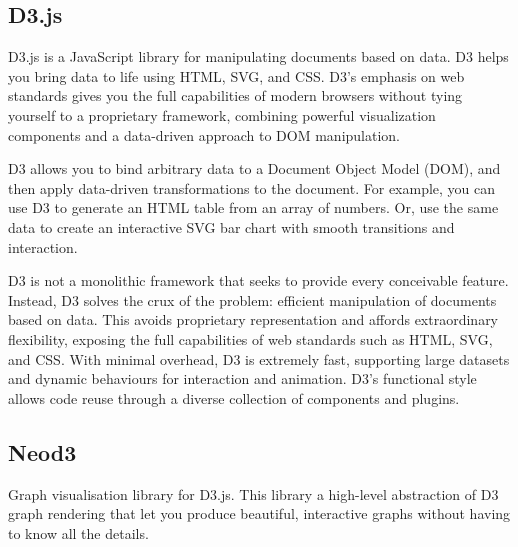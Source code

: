 \subsection{D3.js}
\par D3.js is a JavaScript library for manipulating documents based on data. D3 helps you bring data to life using HTML, SVG, and CSS. D3’s emphasis on web standards gives you the full capabilities of modern browsers without tying yourself to a proprietary framework, combining powerful visualization components and a data-driven approach to DOM manipulation.
\par D3 allows you to bind arbitrary data to a Document Object Model (DOM), and then apply data-driven transformations to the document. For example, you can use D3 to generate an HTML table from an array of numbers. Or, use the same data to create an interactive SVG bar chart with smooth transitions and interaction.
\par D3 is not a monolithic framework that seeks to provide every conceivable feature. Instead, D3 solves the crux of the problem: efficient manipulation of documents based on data. This avoids proprietary representation and affords extraordinary flexibility, exposing the full capabilities of web standards such as HTML, SVG, and CSS. With minimal overhead, D3 is extremely fast, supporting large datasets and dynamic behaviours for interaction and animation. D3’s functional style allows code reuse through a diverse collection of components and plugins.
\subsection{Neod3}
Graph visualisation library for D3.js. This library a high-level abstraction of D3 graph rendering that let you produce beautiful, interactive graphs without having to know all the details.
